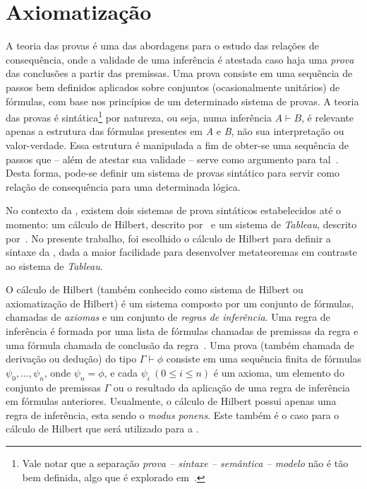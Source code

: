 \section{Axiomatização}\label{sec:axiomatizacao}

    A teoria das provas é uma das abordagens para o estudo das relações de consequência, onde a validade de uma inferência é atestada caso haja uma \textit{prova} das conclusões a partir das premissas. Uma prova consiste em uma sequência de passos bem definidos aplicados sobre conjuntos (ocasionalmente unitários) de fórmulas, com base nos princípios de um determinado sistema de provas. A teoria das provas é sintática\footnote{Vale notar que a separação \textit{prova {--} sintaxe {--} semântica {--} modelo} não é tão bem definida, algo que é explorado em~.} por natureza, ou seja, numa inferência $A \vdash B$, é relevante apenas a estrutura das fórmulas presentes em \textit{A} e \textit{B}, não sua interpretação ou valor-verdade. Essa estrutura é manipulada a fim de obter-se uma sequência de passos que {--} além de atestar sua validade {--} serve como argumento para tal~\cite{sep-logical-consequence}. Desta forma, pode-se definir um sistema de provas sintático para servir como relação de consequência para uma determinada lógica. 

    No contexto da \lfium{}, existem dois sistemas de prova sintáticos estabelecidos até o momento: um cálculo de Hilbert, descrito por~ e um sistema de \textit{Tableau}, descrito por~. No presente trabalho, foi escolhido o cálculo de Hilbert para definir a sintaxe da \lfium{}, dada a maior facilidade para desenvolver metateoremas em contraste ao sistema de \textit{Tableau}.

    O cálculo de Hilbert (também conhecido como sistema de Hilbert ou axiomatização de Hilbert) é um sistema composto por um conjunto de fórmulas, chamadas de \textit{axiomas} e um conjunto de \textit{regras de inferência}. Uma regra de inferência é formada por uma lista de fórmulas chamadas de premissas da regra e uma fórmula chamada de conclusão da regra~\cite{Restall1999-RESAIT-4}. Uma prova (também chamada de derivação ou dedução) do tipo $\Gamma \vdash \phi$ consiste em uma sequência finita de fórmulas \(\psi_0, \dots, \psi_n\), onde \(\psi_n = \phi\), e cada  $\psi_i\ (0 \leq i \leq n)$ é um axioma, um elemento do conjunto de premissas $\Gamma$ ou o resultado da aplicação de uma regra de inferência em fórmulas anteriores. Usualmente, o cálculo de Hilbert possui apenas uma regra de inferência, esta sendo o \textit{modus ponens}. Este também é o caso para o cálculo de Hilbert que será utilizado para a \lfium{}.
    
